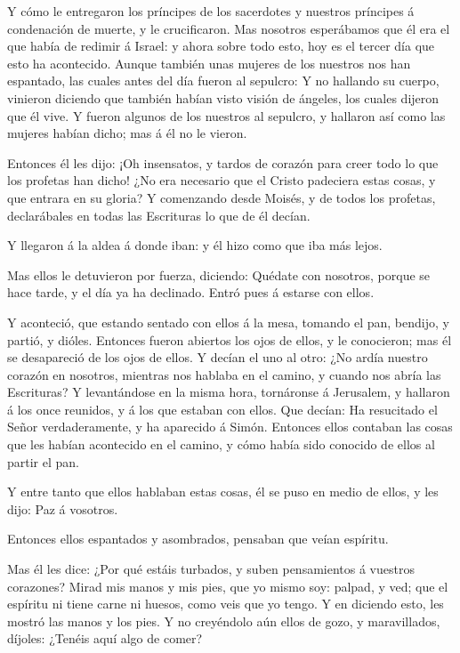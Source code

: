  Y cómo le entregaron los príncipes de los sacerdotes y
nuestros príncipes á condenación de muerte, y le crucificaron.
 Mas nosotros esperábamos que él era el que había de
redimir á Israel: y ahora sobre todo esto, hoy es el tercer día que esto
ha acontecido.  Aunque también unas mujeres de los nuestros
nos han espantado, las cuales antes del día fueron al sepulcro:
 Y no hallando su cuerpo, vinieron diciendo que también
habían visto visión de ángeles, los cuales dijeron que él vive.
 Y fueron algunos de los nuestros al sepulcro, y hallaron
así como las mujeres habían dicho; mas á él no le vieron.

 Entonces él les dijo: ¡Oh insensatos, y tardos de corazón
para creer todo lo que los profetas han dicho!  ¿No era
necesario que el Cristo padeciera estas cosas, y que entrara en su
gloria?  Y comenzando desde Moisés, y de todos los
profetas, declarábales en todas las Escrituras lo que de él decían.

 Y llegaron á la aldea á donde iban: y él hizo como que iba
más lejos.

 Mas ellos le detuvieron por fuerza, diciendo: Quédate con
nosotros, porque se hace tarde, y el día ya ha declinado. Entró pues á
estarse con ellos.

 Y aconteció, que estando sentado con ellos á la mesa,
tomando el pan, bendijo, y partió, y dióles.  Entonces
fueron abiertos los ojos de ellos, y le conocieron; mas él se
desapareció de los ojos de ellos.  Y decían el uno al otro:
¿No ardía nuestro corazón en nosotros, mientras nos hablaba en el
camino, y cuando nos abría las Escrituras?  Y levantándose
en la misma hora, tornáronse á Jerusalem, y hallaron á los once
reunidos, y á los que estaban con ellos.  Que decían: Ha
resucitado el Señor verdaderamente, y ha aparecido á Simón.
 Entonces ellos contaban las cosas que les habían
acontecido en el camino, y cómo había sido conocido de ellos al partir
el pan.

 Y entre tanto que ellos hablaban estas cosas, él se puso
en medio de ellos, y les dijo: Paz á vosotros.

 Entonces ellos espantados y asombrados, pensaban que veían
espíritu.

 Mas él les dice: ¿Por qué estáis turbados, y suben
pensamientos á vuestros corazones?  Mirad mis manos y mis
pies, que yo mismo soy: palpad, y ved; que el espíritu ni tiene carne ni
huesos, como veis que yo tengo.  Y en diciendo esto, les
mostró las manos y los pies.  Y no creyéndolo aún ellos de
gozo, y maravillados, díjoles: ¿Tenéis aquí algo de comer?

